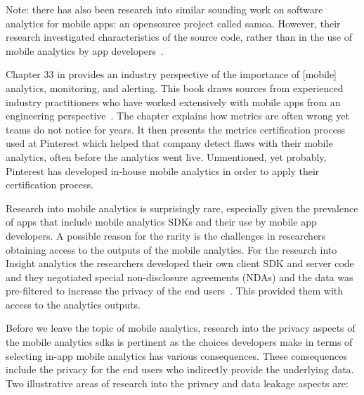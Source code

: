 Note: there has also been research into similar sounding work on software analytics for mobile apps: an opensource project called \Gls{samoa}. However, their research investigated characteristics of the source code, rather than in the use of mobile analytics by app developers~.

Chapter 33 in  provides an industry perspective of the importance of [mobile] analytics, monitoring, and alerting. This book draws sources from experienced industry practitioners who have worked extensively with mobile apps from an engineering perspective~. The chapter explains how metrics are often wrong yet teams do not notice for years. It then presents the metrics certification process used at Pinterest which helped that company detect flaws with their mobile analytics, often before the analytics went live. Unmentioned, yet probably, Pinterest has developed in-house mobile analytics in order to apply their certification process.

Research into mobile analytics is surprisingly rare, especially given the prevalence of apps that include mobile analytics SDKs and their use by mobile app developers. A possible reason for the rarity is the challenges in researchers obtaining access to the outputs of the mobile analytics. For the research into Insight analytics the researchers developed their own client SDK and server code and they negotiated special non-disclosure agreements (NDAs) and the data was pre-filtered to increase the privacy of the end users~. This provided them with access to the analytics outputs.

Before we leave the topic of mobile analytics, research into the privacy aspects of the mobile analytics \Glspl{sdk} is pertinent as the choices developers make in terms of selecting in-app mobile analytics has various consequences. These consequences include the privacy for the end users who indirectly provide the underlying data. Two illustrative areas of research into the privacy and data leakage aspects are:

